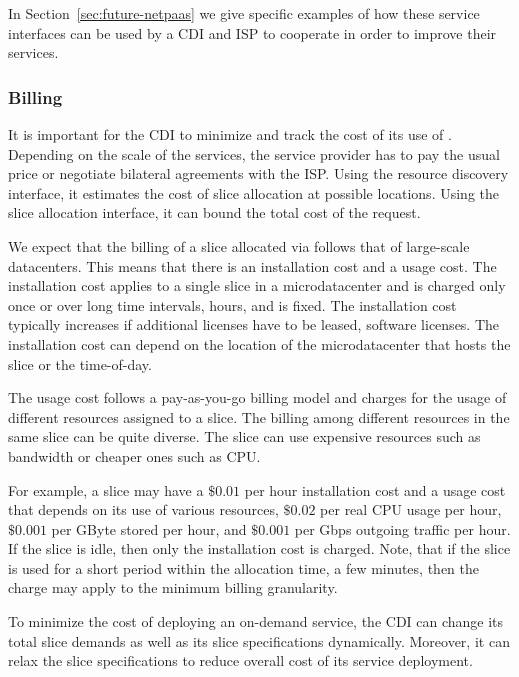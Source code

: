 In Section~\ref{sec:future-netpaas} we give specific examples of how these
service interfaces can be used by a CDI and ISP to cooperate in order to
improve their services.


\subsubsection{Billing}\label{sec:billing}

It is important for the CDI to minimize and track the cost of its use of
\onservice.  Depending on the scale of the services, the service provider has
to pay the usual price or negotiate bilateral agreements with the ISP. Using
the resource discovery interface, it estimates the cost of slice allocation at
possible locations. Using the slice allocation interface, it can bound the
total cost of the request.

We expect that the billing of a slice allocated via \onservice follows that of
large-scale datacenters.  This means that there is an installation cost and a
usage cost.  The installation cost applies to a single slice in a
microdatacenter and is charged only once or over long time intervals, \eg
hours, and is fixed. The installation cost typically increases if additional
licenses have to be leased, \eg software licenses. The installation cost can
depend on the location of the microdatacenter that hosts the slice or the
time-of-day.

The usage cost follows a pay-as-you-go billing model and charges for the usage
of different resources assigned to a slice.  The billing among different
resources in the same slice can be quite diverse. The slice can use expensive
resources such as bandwidth or cheaper ones such as CPU.

For example, a slice may have a $\$ 0.01$ per hour installation cost and a
usage cost that depends on its use of various resources, \eg $\$ 0.02$ per real
CPU usage per hour, $\$ 0.001$ per GByte stored per hour, and $\$ 0.001$ per
Gbps outgoing traffic per hour.  If the slice is idle, then only the
installation cost is charged. Note, that if the slice is used for a short
period within the allocation time, \eg a few minutes, then the charge may apply
to the minimum billing granularity.

To minimize the cost of deploying an on-demand service, the CDI can change its
total slice demands as well as its slice specifications dynamically. Moreover,
it can relax the slice specifications to reduce overall cost of its service
deployment.



